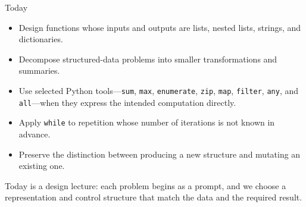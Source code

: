 \documentclass[aspectratio=169,10pt]{beamer}
\begin{document}
\makedecktitle

\begin{frame}{Today}
  \begin{itemize}
    \item Design functions whose inputs and outputs are lists, nested lists, strings, and dictionaries.
    \item Decompose structured-data problems into smaller transformations and summaries.
    \item Use selected Python tools---\texttt{sum}, \texttt{max}, \texttt{enumerate}, \texttt{zip}, \texttt{map}, \texttt{filter}, \texttt{any}, and \texttt{all}---when they express the intended computation directly.
    \item Apply \texttt{while} to repetition whose number of iterations is not known in advance.
    \item Preserve the distinction between producing a new structure and mutating an existing one.
  \end{itemize}

  \begin{keyidea}
    Today is a design lecture: each problem begins as a prompt, and we choose a representation and control structure that match the data and the required result.
  \end{keyidea}
\end{frame}
\end{document}
